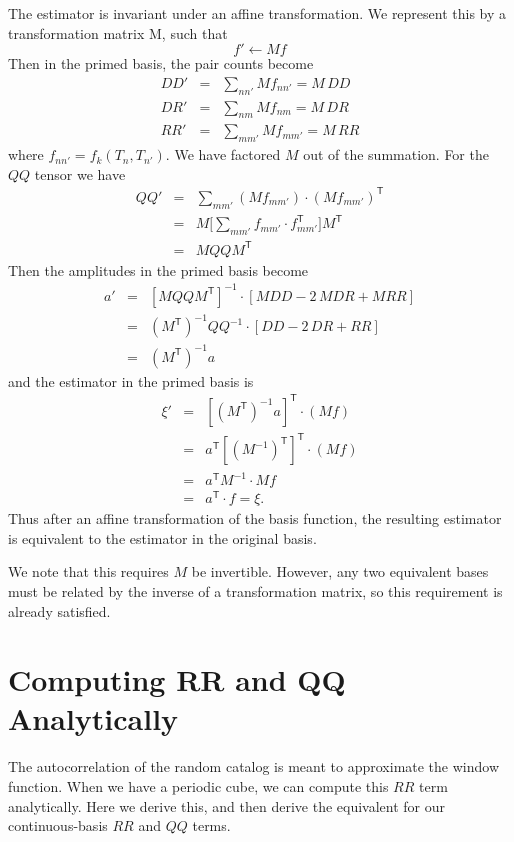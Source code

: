 \documentclass[modern]{aastex62}
\newcommand{\inv}{^{-1}}
\newcommand{\T}{^{\mathsf{T}}}
\begin{document}
The estimator is invariant under an affine transformation. We represent this by a transformation matrix M, such that 
\begin{equation}
f' \leftarrow Mf
\end{equation}
Then in the primed basis, the pair counts become
\begin{eqnarray}\displaystyle
DD' &=& \sum_{n n'} M f_{n n'} = M\,DD
\\
DR' &=& \sum_{n m} M f_{n m} = M\,DR
\\
RR' &=& \sum_{m m'} M f_{m m'} = M\,RR
\end{eqnarray}
where $f_{n n'} = f_k(T_n, T_{n'})$.
We have factored $M$ out of the summation. For the $QQ$ tensor we have
\begin{eqnarray}\displaystyle
QQ' &=& \sum_{m m'} (Mf_{m m'}) \cdot (Mf_{m m'})\T \\
&=& M\Bigg[ \sum_{m m'} f_{m m'} \cdot f_{m m'}\T \Bigg]M\T \\
&=& M QQ M\T
\end{eqnarray}
Then the amplitudes in the primed basis become
\begin{eqnarray}\displaystyle
a' &=& [M QQ M\T]\inv \cdot [MDD - 2\,MDR + MRR] \\
&=& (M\T)\inv QQ\inv \cdot [DD - 2\,DR + RR] \\
&=& (M\T)\inv a
\end{eqnarray}
and the estimator in the primed basis is 
\begin{eqnarray}\displaystyle
\xi' &=& [(M\T)\inv a]\T \cdot (Mf) \\
&=& a\T[(M\inv)\T]\T \cdot (Mf) \\
&=& a\T M\inv \cdot Mf \\
&=& a\T \cdot f = \xi.
\end{eqnarray}
Thus after an affine transformation of the basis function, the resulting estimator is equivalent to the estimator in the original basis.

We note that this requires $M$ be invertible.
However, any two equivalent bases must be related by the inverse of a transformation matrix, so this requirement is already satisfied.


\section{Computing RR and QQ Analytically}\label{sec:analytic}

The autocorrelation of the random catalog is meant to approximate the window function. 
When we have a periodic cube, we can compute this $RR$ term analytically.
Here we derive this, and then derive the equivalent for our continuous-basis $RR$ and $QQ$ terms.
\end{document}
